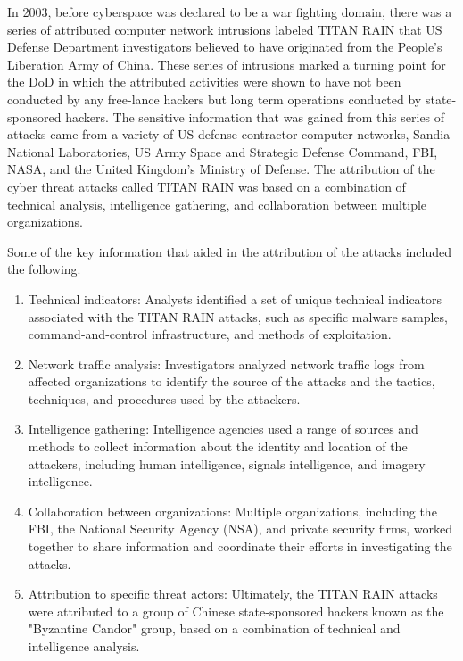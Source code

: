 \documentclass[12pt]{report}
\begin{document}
In 2003, before cyberspace was declared to be a war fighting domain, there was a series of attributed computer network intrusions labeled TITAN RAIN that US Defense Department investigators believed to have originated from the People’s Liberation Army of China.  These series of intrusions marked a turning point for the DoD in which the attributed activities were shown to have not been conducted by any free-lance hackers but long term operations conducted by state-sponsored hackers.  The sensitive information that was gained from this series of attacks came from a variety of US defense contractor computer networks, Sandia National Laboratories, US Army Space and Strategic Defense Command, FBI, NASA, and the United Kingdom’s Ministry of Defense.  The attribution of the cyber threat attacks called TITAN RAIN was based on a combination of technical analysis, intelligence gathering, and collaboration between multiple organizations.

Some of the key information that aided in the attribution of the attacks included the following.

\begin{enumerate}
  \item Technical indicators: Analysts identified a set of unique technical indicators associated with the TITAN RAIN attacks, such as specific malware samples, command-and-control infrastructure, and methods of exploitation.
  \item  Network traffic analysis: Investigators analyzed network traffic logs from affected organizations to identify the source of the attacks and the tactics, techniques, and procedures used by the attackers.
  \item Intelligence gathering: Intelligence agencies used a range of sources and methods to collect information about the identity and location of the attackers, including human intelligence, signals intelligence, and imagery intelligence.
  \item Collaboration between organizations: Multiple organizations, including the FBI, the National Security Agency (NSA), and private security firms, worked together to share information and coordinate their efforts in investigating the attacks.
  \item Attribution to specific threat actors: Ultimately, the TITAN RAIN attacks were attributed to a group of Chinese state-sponsored hackers known as the "Byzantine Candor" group, based on a combination of technical and intelligence analysis.
\end{enumerate}
\end{document}
